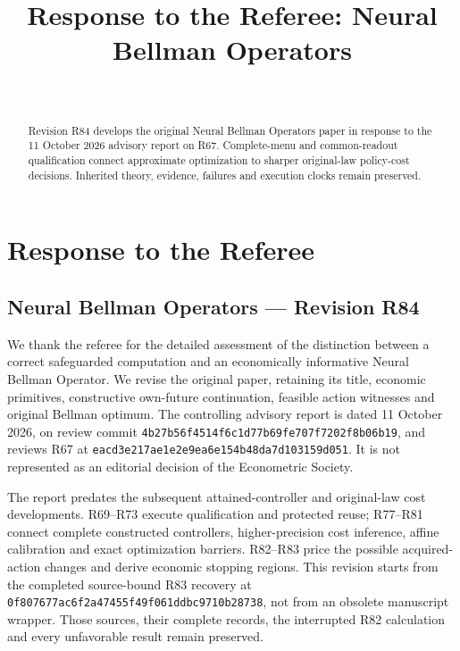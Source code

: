 \documentclass[ecta,nameyear,draft]{econsocart}
\begin{document}
\begin{frontmatter}
\title{Response to the Referee: Neural Bellman Operators}
\begin{aug}
\author[id=au1,addressref={add1}]{~}
\address[id=add1]{Peking University}
\end{aug}
\begin{abstract}Revision R84 develops the original Neural Bellman Operators paper in response to the 11 October 2026 advisory report on R67. Complete-menu and common-readout qualification connect approximate optimization to sharper original-law policy-cost decisions. Inherited theory, evidence, failures and execution clocks remain preserved.\end{abstract}
\end{frontmatter}
\providecommand{\tightlist}{\setlength{\itemsep}{0pt}\setlength{\parskip}{0pt}}
\hypertarget{response-to-the-referee}{%
\section{Response to the Referee}\label{response-to-the-referee}}

\hypertarget{neural-bellman-operators-revision-r84}{%
\subsection{Neural Bellman Operators --- Revision
R84}\label{neural-bellman-operators-revision-r84}}

We thank the referee for the detailed assessment of the distinction
between a correct safeguarded computation and an economically
informative Neural Bellman Operator. We revise the original paper,
retaining its title, economic primitives, constructive own-future
continuation, feasible action witnesses and original Bellman optimum.
The controlling advisory report is dated 11 October 2026, on review
commit \nolinkurl{4b27b56f4514f6c1d77b69fe707f7202f8b06b19}, and reviews
R67 at \nolinkurl{eacd3e217ae1e2e9ea6e154b48da7d103159d051}. It is not
represented as an editorial decision of the Econometric Society.

The report predates the subsequent attained-controller and original-law
cost developments. R69--R73 execute qualification and protected reuse;
R77--R81 connect complete constructed controllers, higher-precision cost
inference, affine calibration and exact optimization barriers. R82--R83
price the possible acquired-action changes and derive economic stopping
regions. This revision starts from the completed source-bound R83
recovery at \nolinkurl{0f807677ac6f2a47455f49f061ddbc9710b28738}, not from
an obsolete manuscript wrapper. Those sources, their complete records,
the interrupted R82 calculation and every unfavorable result remain
preserved.
\end{document}
